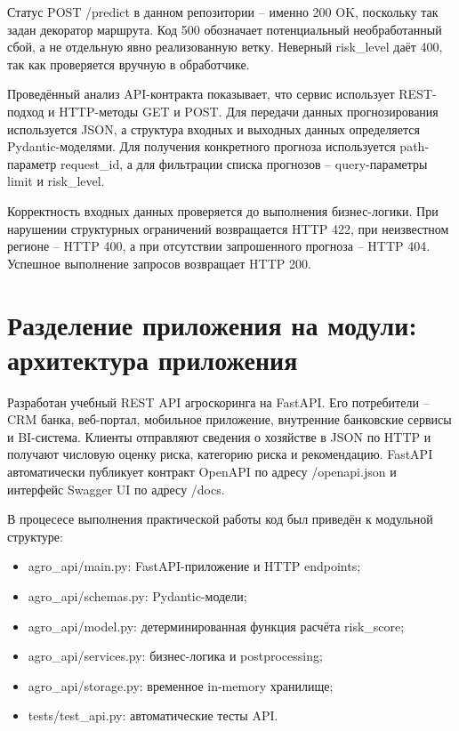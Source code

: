 \documentclass[
]{article}
\begin{document}
Статус POST /predict в данном репозитории -- именно 200 OK, поскольку
так задан декоратор маршрута. Код 500 обозначает потенциальный
необработанный сбой, а не отдельную явно реализованную ветку. Неверный
risk\_level даёт 400, так как проверяется вручную в обработчике.

Проведённый анализ API-контракта показывает, что сервис использует
REST-подход и HTTP-методы GET и POST. Для передачи данных
прогнозирования используется JSON, а структура входных и выходных данных
определяется Pydantic-моделями. Для получения конкретного прогноза
используется path-параметр request\_id, а для фильтрации списка
прогнозов -- query-параметры limit и risk\_level.

Корректность входных данных проверяется до выполнения бизнес-логики. При
нарушении структурных ограничений возвращается HTTP 422, при неизвестном
регионе -- HTTP 400, а при отсутствии запрошенного прогноза -- HTTP 404.
Успешное выполнение запросов возвращает HTTP 200.

\section{Разделение приложения на модули: архитектура
приложения}\label{ux440ux430ux437ux434ux435ux43bux435ux43dux438ux435-ux43fux440ux438ux43bux43eux436ux435ux43dux438ux44f-ux43dux430-ux43cux43eux434ux443ux43bux438-ux430ux440ux445ux438ux442ux435ux43aux442ux443ux440ux430-ux43fux440ux438ux43bux43eux436ux435ux43dux438ux44f}

Разработан учебный REST API агроскоринга на FastAPI. Его потребители --
CRM банка, веб-портал, мобильное приложение, внутренние банковские
сервисы и BI-система. Клиенты отправляют сведения о хозяйстве в JSON по
HTTP и получают числовую оценку риска, категорию риска и рекомендацию.
FastAPI автоматически публикует контракт OpenAPI по адресу /openapi.json
и интерфейс Swagger UI по адресу /docs.

В процесесе выполнения практической работы код был приведён к модульной
структуре:

\begin{itemize}
\item
  agro\_api/main.py: FastAPI-приложение и HTTP endpoints;
\item
  agro\_api/schemas.py: Pydantic-модели;
\item
  agro\_api/model.py: детерминированная функция расчёта risk\_score;
\item
  agro\_api/services.py: бизнес-логика и postprocessing;
\item
  agro\_api/storage.py: временное in-memory хранилище;
\item
  tests/test\_api.py: автоматические тесты API.
\end{itemize}
\end{document}
